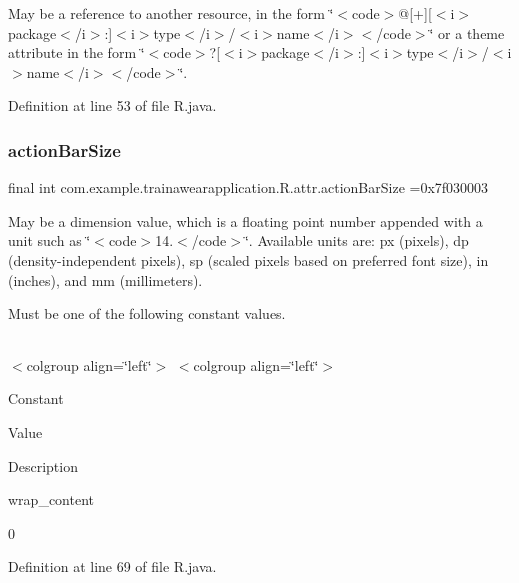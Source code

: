 May be a reference to another resource, in the form \char`\"{}$<$code$>$@\mbox{[}+\mbox{]}\mbox{[}$<$i$>$package$<$/i$>$\+:\mbox{]}$<$i$>$type$<$/i$>$/$<$i$>$name$<$/i$>$$<$/code$>$\char`\"{} or a theme attribute in the form \char`\"{}$<$code$>$?\mbox{[}$<$i$>$package$<$/i$>$\+:\mbox{]}$<$i$>$type$<$/i$>$/$<$i$>$name$<$/i$>$$<$/code$>$\char`\"{}. 

Definition at line 53 of file R.\+java.

\mbox{\label{classcom_1_1example_1_1trainawearapplication_1_1_r_1_1attr_a6717c5831d37196ee66ac6fffd2c8da9}} 
\subsubsection{\texorpdfstring{actionBarSize}{actionBarSize}}
{\footnotesize\ttfamily final int com.\+example.\+trainawearapplication.\+R.\+attr.\+action\+Bar\+Size =0x7f030003\hspace{0.3cm}{\ttfamily [static]}}

May be a dimension value, which is a floating point number appended with a unit such as \char`\"{}$<$code$>$14.\+5sp$<$/code$>$\char`\"{}. Available units are\+: px (pixels), dp (density-\/independent pixels), sp (scaled pixels based on preferred font size), in (inches), and mm (millimeters). 

Must be one of the following constant values.

\tabulinesep=1mm
\begin{longtabu}spread 0pt [c]{*{0}{|X[-1]}|}
\hline
\end{longtabu}
$<$colgroup align=\char`\"{}left\char`\"{}$>$ $<$colgroup align=\char`\"{}left\char`\"{}$>$ 

Constant

Value

Description 

wrap\+\_\+content

0

Definition at line 69 of file R.\+java.

\mbox{\label{classcom_1_1example_1_1trainawearapplication_1_1_r_1_1attr_a8a2c9ee85e3737411e75f4281ff3ec27}} 
